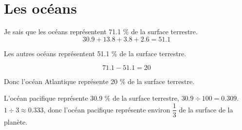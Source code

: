 \section{Les océans}

\begin{questions}
	\question Je sais que les océans représentent \num{71.1} \% de la surface terrestre.
	\begin{equation*}
		\num{30.9} + \num{13.8} + \num{3.8} + \num{2.6} = \num{51.1}
	\end{equation*}
	
	Les autres océans représentent \num{51.1} \% de la surface terrestre.
	
	\begin{equation*}
		 \num{71.1} - \num{51.1} = \num{20}
	\end{equation*}
	
	Donc l'océan Atlantique représente 20 \% de la surface terrestre.
	
	
	\question L'océan pacifique représente \num{30.9} \% de la surface terrestre, $\num{30.9} \div 100 = \num{0.309}$.
	$1 \div 3 \approx 0.333$, donc l'océan pacifique représente environ $\dfrac{1}{3}$ de la surface de la planète.
	
	
	\question {}
\end{questions}